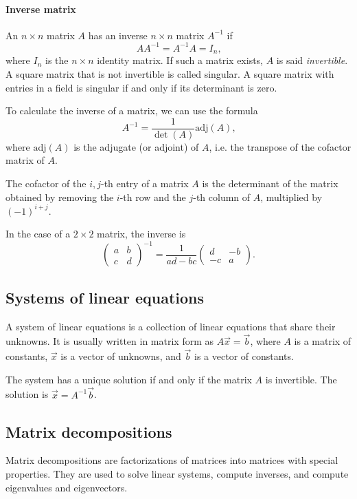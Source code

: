 \paragraph{Inverse matrix}  An $n \times n$ matrix $A$ has an inverse $n \times n$ matrix
$A^{-1}$ if
\[
  A A^{-1} = A^{-1} A = I_n\text{,}
\]
where $I_n$ is the $n \times n$ identity matrix.  If such a matrix exists, $A$ is said
\emph{invertible}.  A square matrix that is not invertible is called singular. A square
matrix with entries in a field is singular if and only if its determinant is zero.

To calculate the inverse of a matrix, we can use the formula
\[
  A^{-1} = \frac{1}{\det(A)} \text{adj}(A)\text{,}
\]
where $\text{adj}(A)$ is the adjugate (or adjoint) of $A$, i.e. the transpose of the cofactor matrix
of $A$.

The cofactor of the $i, j$-th entry of a matrix $A$ is the determinant of the matrix
obtained by removing the $i$-th row and the $j$-th column of $A$, multiplied by $(-1)^{i
+ j}$.

In the case of a $2 \times 2$ matrix, the inverse is
\[
  \begin{pmatrix}
    a & b \\
    c & d
  \end{pmatrix}^{-1} = \frac{1}{ad - bc}
  \begin{pmatrix}
    d & -b \\
    -c & a
  \end{pmatrix}\text{.}
\]

\subsection{Systems of linear equations}

A system of linear equations is a collection of linear equations that share their
unknowns.  It is usually written in matrix form as $A \vec{x} = \vec{b}$, where $A$ is a
matrix of constants, $\vec{x}$ is a vector of unknowns, and $\vec{b}$ is a vector of
constants.

The system has a unique solution if and only if the matrix $A$ is invertible.  The
solution is $\vec{x} = A^{-1} \vec{b}$.

\subsection{Matrix decompositions}

Matrix decompositions are factorizations of matrices into matrices with special
properties.  They are used to solve linear systems, compute inverses, and compute
eigenvalues and eigenvectors.

